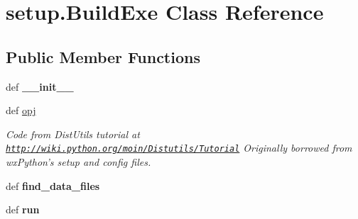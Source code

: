 \hypertarget{classsetup_1_1_build_exe}{\section{setup.\-Build\-Exe Class Reference}
\label{classsetup_1_1_build_exe}
}
\subsection*{Public Member Functions}
\begin{DoxyCompactItemize}
\item 
\hypertarget{classsetup_1_1_build_exe_a84b17d860c8eb8d2d29da2f21313138b}{def {\bfseries \-\_\-\-\_\-init\-\_\-\-\_\-}}\label{classsetup_1_1_build_exe_a84b17d860c8eb8d2d29da2f21313138b}

\item 
\hypertarget{classsetup_1_1_build_exe_a30782cd3425186df73b8a116dd230104}{def \hyperlink{classsetup_1_1_build_exe_a30782cd3425186df73b8a116dd230104}{opj}}\label{classsetup_1_1_build_exe_a30782cd3425186df73b8a116dd230104}

\begin{DoxyCompactList}\small\item\em Code from Dist\-Utils tutorial at \href{http://wiki.python.org/moin/Distutils/Tutorial}{\tt http\-://wiki.\-python.\-org/moin/\-Distutils/\-Tutorial} Originally borrowed from wx\-Python's setup and config files. \end{DoxyCompactList}\item 
\hypertarget{classsetup_1_1_build_exe_ab0c85bff0ed56583e94f29867b55b26e}{def {\bfseries find\-\_\-data\-\_\-files}}\label{classsetup_1_1_build_exe_ab0c85bff0ed56583e94f29867b55b26e}

\item 
\hypertarget{classsetup_1_1_build_exe_a3541fe4525e041c9cb929754e97f4e9e}{def {\bfseries run}}\label{classsetup_1_1_build_exe_a3541fe4525e041c9cb929754e97f4e9e}

\end{DoxyCompactItemize}
